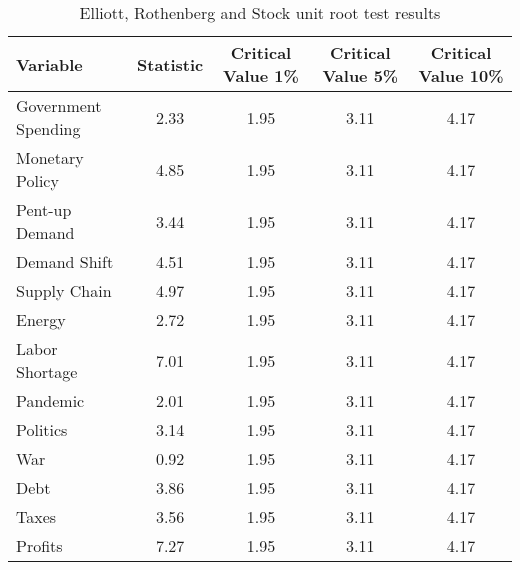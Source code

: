 \begin{sidewaystable}[H]
\centering
\caption{Elliott, Rothenberg and Stock unit root test results}\label{table:ers}

\begin{tabular}{lcccc}
\toprule
\textbf{Variable} & \textbf{Statistic} & \textbf{Critical Value 1\%} & \textbf{Critical Value 5\%} & \textbf{Critical Value 10\%} \\
\midrule
Government Spending & 2.33 & 1.95 & 3.11 & 4.17 \\
Monetary Policy & 4.85 & 1.95 & 3.11 & 4.17 \\
Pent-up Demand & 3.44 & 1.95 & 3.11 & 4.17 \\
Demand Shift & 4.51 & 1.95 & 3.11 & 4.17 \\
Supply Chain & 4.97 & 1.95 & 3.11 & 4.17 \\
Energy & 2.72 & 1.95 & 3.11 & 4.17 \\
Labor Shortage & 7.01 & 1.95 & 3.11 & 4.17 \\
Pandemic & 2.01 & 1.95 & 3.11 & 4.17 \\
Politics & 3.14 & 1.95 & 3.11 & 4.17 \\
War & 0.92 & 1.95 & 3.11 & 4.17 \\
Debt & 3.86 & 1.95 & 3.11 & 4.17 \\
Taxes & 3.56 & 1.95 & 3.11 & 4.17 \\
Profits & 7.27 & 1.95 & 3.11 & 4.17 \\
\bottomrule
\end{tabular}
\end{sidewaystable}
